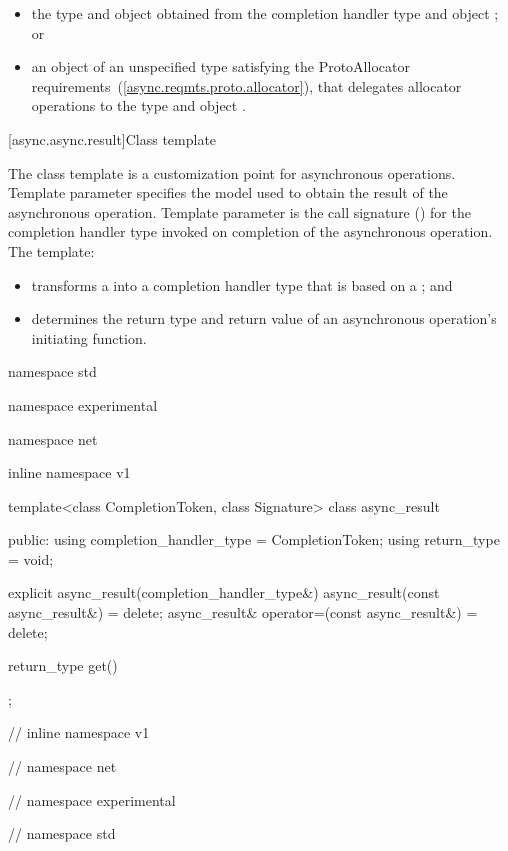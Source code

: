 \begin{itemize}
\item
the type  and object  obtained from the completion handler type  and object ; or

\item
an object of an unspecified type satisfying the ProtoAllocator requirements~(\ref{async.reqmts.proto.allocator}), that delegates allocator operations to the type  and object .
\end{itemize}



[async.async.result]{Class template }

%
\pnum
The  class template is a customization point for asynchronous operations. Template parameter  specifies the model used to obtain the result of the asynchronous operation. Template parameter  is the call signature () for the completion handler type invoked on completion of the asynchronous operation. The  template:

\begin{itemize}
\item
transforms a  into a completion handler type that is based on a ; and

\item
determines the return type and return value of an asynchronous operation's initiating function.
\end{itemize}

\begin{codeblock}
namespace std {
namespace experimental {
namespace net {
inline namespace v1 {

  template<class CompletionToken, class Signature>
  class async_result
  {
  public:
    using completion_handler_type = CompletionToken;
    using return_type = void;

    explicit async_result(completion_handler_type&) {}
    async_result(const async_result&) = delete;
    async_result& operator=(const async_result&) = delete;

    return_type get() {}
  };

} // inline namespace v1
} // namespace net
} // namespace experimental
} // namespace std
\end{codeblock}

